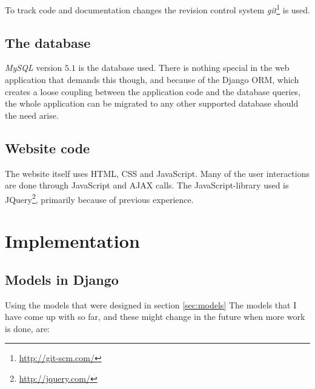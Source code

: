 \documentclass[12pt, a4paper,titlepage]{article}
\begin{document}
To track code and documentation changes the revision control system \emph{git}\footnote{\url{http://git-scm.com/}} is used.

\subsection{The database}
\emph{MySQL} version $5.1$ is the database used. There is nothing special in
the web application that demands this though, and because of the Django 
ORM, which creates a loose coupling between the application code and the
database queries, the whole application can be migrated to any other
supported database should the need arise.

\subsection{Website code}

The website itself uses HTML, CSS and JavaScript. 
Many of the user interactions are done through JavaScript and AJAX calls.
The JavaScript-library used is JQuery\footnote{\url{http://jquery.com/}},
primarily because of previous experience.

\section{Implementation}

\subsection{Models in Django}
\label{sec:djangomodels}
Using the models that were designed in section \ref{sec:models}
The models that I have come up with so far, and these might change in the
future when more work is done, are:
\end{document}
